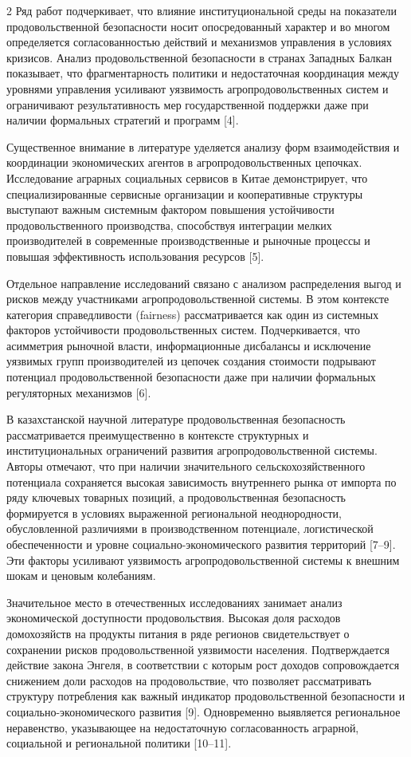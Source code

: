 \begin{multicols}{2}
Ряд работ подчеркивает, что влияние институциональной среды на
показатели продовольственной безопасности носит опосредованный характер
и во многом определяется согласованностью действий и механизмов
управления в условиях кризисов. Анализ продовольственной безопасности в
странах Западных Балкан показывает, что фрагментарность политики и
недостаточная координация между уровнями управления усиливают уязвимость
агропродовольственных систем и ограничивают результативность мер
государственной поддержки даже при наличии формальных стратегий и
программ {[}4{]}.

Существенное внимание в литературе уделяется анализу форм взаимодействия
и координации экономических агентов в агропродовольственных цепочках.
Исследование аграрных социальных сервисов в Китае демонстрирует, что
специализированные сервисные организации и кооперативные структуры
выступают важным системным фактором повышения устойчивости
продовольственного производства, способствуя интеграции мелких
производителей в современные производственные и рыночные процессы и
повышая эффективность использования ресурсов {[}5{]}.

Отдельное направление исследований связано с анализом распределения
выгод и рисков между участниками агропродовольственной системы. В этом
контексте категория справедливости (fairness) рассматривается как один
из системных факторов устойчивости продовольственных систем.
Подчеркивается, что асимметрия рыночной власти, информационные
дисбалансы и исключение уязвимых групп производителей из цепочек
создания стоимости подрывают потенциал продовольственной безопасности
даже при наличии формальных регуляторных механизмов {[}6{]}.

В казахстанской научной литературе продовольственная безопасность
рассматривается преимущественно в контексте структурных и
институциональных ограничений развития агропродовольственной системы.
Авторы отмечают, что при наличии значительного сельскохозяйственного
потенциала сохраняется высокая зависимость внутреннего рынка от импорта
по ряду ключевых товарных позиций, а продовольственная безопасность
формируется в условиях выраженной региональной неоднородности,
обусловленной различиями в производственном потенциале, логистической
обеспеченности и уровне социально-экономического развития территорий
{[}7--9{]}. Эти факторы усиливают уязвимость агропродовольственной
системы к внешним шокам и ценовым колебаниям.

Значительное место в отечественных исследованиях занимает анализ
экономической доступности продовольствия. Высокая доля расходов
домохозяйств на продукты питания в ряде регионов свидетельствует о
сохранении рисков продовольственной уязвимости населения. Подтверждается
действие закона Энгеля, в соответствии с которым рост доходов
сопровождается снижением доли расходов на продовольствие, что позволяет
рассматривать структуру потребления как важный индикатор
продовольственной безопасности и социально-экономического развития
{[}9{]}. Одновременно выявляется региональное неравенство, указывающее
на недостаточную согласованность аграрной, социальной и региональной
политики {[}10--11{]}.


\end{multicols}
